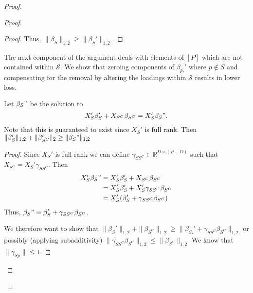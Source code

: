 \begin{proof}
\begin{proof}
\begin{proof}
Thus, $\|\beta_S\|_{1,2} \geq \|\beta_S'\|_{1,2}$.

\end{proof}

The next component of the argument deals with elements of $[P]$ which are not contained within $\mathcal S$.
We show that zeroing components of $\beta_{p.}'$ where $p \not \in S$ and compensating for the removal by altering the loadings within $\mathcal S$ results in lower loss.

\begin{proposition}
Let $\beta_S"$ be the solution to
\begin{align}
X_S' \beta_S ' + X_{S^C} \beta_{S^C} = X_S' \beta_S". %
\end{align}
Note that this is guaranteed to exist since $X_S'$ is full rank.  
Then $\|\beta_{S}'\|_{1,2} + \|\beta_{S^C}'\|_2 \geq \|\beta_S"\|_{1,2}$
\end{proposition}

\begin{proof}
Since $X_S'$ is full rank we can define $\gamma_{SS^C} \in \mathbb R^{D \times (P-D)}$ such that $X_{S^C} = X_S' \gamma_{SS^C}$.
Then 
\begin{align}
X_S' \beta_S" &= X_S' \beta_S ' + X_{S^C} \beta_{S^C} \\
&= X_S' \beta_S ' + X_S' \gamma_{SS^C} \beta_{S^C} \\
&= X_S'( \beta_S ' + \gamma_{SS^C} \beta_{S^C} )
\end{align}
Thus, $\beta_S" = \beta_S' + \gamma_{SS^C}\beta_{S^C}$.

We therefore want to show that $\|\beta_S'\|_{1,2} + \|\beta_{S^C}\|_{1,2} \geq \| \beta_{S.}' + \gamma_{SS^C}\beta_{S^C}\|_{1,2}$  %
or possibly (applying subadditivity)
$\| \gamma_{SS^C}\beta_{S^C}\|_{1,2} \leq \|\beta_{S^C}\|_{1,2}$ %
We know that $\| \gamma_{Sp}\|\leq 1$.



\end{proof}
\end{proof}
\end{proof}
